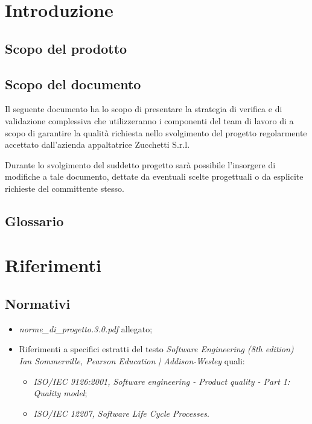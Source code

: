 

\setcounter{page}{1}
\pagestyle{normal}

\section{Introduzione}
\subsection{Scopo del prodotto}
\purpose

\subsection{Scopo del documento}

Il seguente documento ha lo scopo di presentare la strategia di verifica e di validazione complessiva che utilizzeranno i componenti del team di lavoro di \team{} a scopo di garantire la qualità richiesta nello svolgimento del progetto \caName{} regolarmente accettato dall'azienda appaltatrice Zucchetti S.r.l.

Durante lo svolgimento del suddetto progetto sarà possibile l'insorgere di modifiche a tale documento, dettate da eventuali scelte progettuali o da esplicite richieste del committente stesso.

\subsection{Glossario}
\glossaryIntro
\clearpage

\section{Riferimenti}

\subsection{Normativi}

\begin{itemize}
\item[] \textit{norme\_di\_progetto.3.0.pdf} allegato;
\item[]  Riferimenti a specifici estratti del testo \textit{Software Engineering (8th edition) Ian Sommerville, Pearson Education | Addison-Wesley} quali:
\begin{itemize}
\item[]  \textit{ISO/IEC 9126:2001, Software engineering - Product quality - Part 1: Quality model};
\item[]  \textit{ISO/IEC 12207, Software Life Cycle Processes}.
\end{itemize}
\end{itemize}

